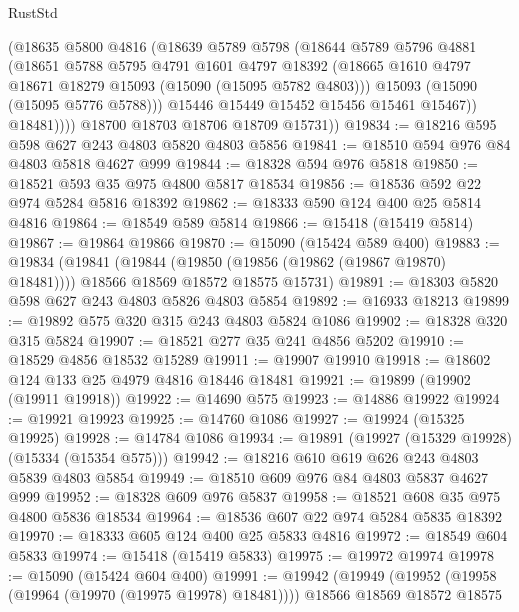 \begin{lexlean}{RustStd}
\begin{coremodule}
              (@18635
                @5800
                @4816
                (@18639
                  @5789
                  @5798
                  (@18644
                    @5789
                    @5796
                    @4881
                    (@18651
                      @5788
                      @5795
                      @4791
                      @1601
                      @4797
                      @18392
                      (@18665 @1610 @4797 @18671 @18279 @15093 (@15090 (@15095 @5782 @4803)))
                      @15093
                      (@15090 (@15095 @5776 @5788)))
                    @15446
                    @15449
                    @15452
                    @15456
                    @15461
                    @15467))
                @18481))))
        @18700
        @18703
        @18706
        @18709
        @15731))
@19834 := @18216 @595 @598 @627 @243 @4803 @5820 @4803 @5856
@19841 := @18510 @594 @976 @84 @4803 @5818 @4627 @999
@19844 := @18328 @594 @976 @5818
@19850 := @18521 @593 @35 @975 @4800 @5817 @18534
@19856 := @18536 @592 @22 @974 @5284 @5816 @18392
@19862 := @18333 @590 @124 @400 @25 @5814 @4816
@19864 := @18549 @589 @5814
@19866 := @15418 (@15419 @5814)
@19867 := @19864 @19866
@19870 := @15090 (@15424 @589 @400)
@19883 := @19834
    (@19841
      (@19844 (@19850 (@19856 (@19862 (@19867 @19870) @18481))))
      @18566
      @18569
      @18572
      @18575
      @15731)
@19891 := @18303 @5820 @598 @627 @243 @4803 @5826 @4803 @5854
@19892 := @16933 @18213
@19899 := @19892 @575 @320 @315 @243 @4803 @5824 @1086
@19902 := @18328 @320 @315 @5824
@19907 := @18521 @277 @35 @241 @4856 @5202
@19910 := @18529 @4856 @18532 @15289
@19911 := @19907 @19910
@19918 := @18602 @124 @133 @25 @4979 @4816 @18446 @18481
@19921 := @19899 (@19902 (@19911 @19918))
@19922 := @14690 @575
@19923 := @14886 @19922
@19924 := @19921 @19923
@19925 := @14760 @1086
@19927 := @19924 (@15325 @19925)
@19928 := @14784 @1086
@19934 := @19891 (@19927 (@15329 @19928) (@15334 (@15354 @575)))
@19942 := @18216 @610 @619 @626 @243 @4803 @5839 @4803 @5854
@19949 := @18510 @609 @976 @84 @4803 @5837 @4627 @999
@19952 := @18328 @609 @976 @5837
@19958 := @18521 @608 @35 @975 @4800 @5836 @18534
@19964 := @18536 @607 @22 @974 @5284 @5835 @18392
@19970 := @18333 @605 @124 @400 @25 @5833 @4816
@19972 := @18549 @604 @5833
@19974 := @15418 (@15419 @5833)
@19975 := @19972 @19974
@19978 := @15090 (@15424 @604 @400)
@19991 := @19942
    (@19949
      (@19952 (@19958 (@19964 (@19970 (@19975 @19978) @18481))))
      @18566
      @18569
      @18572
      @18575

\end{coremodule}
\end{lexlean}
